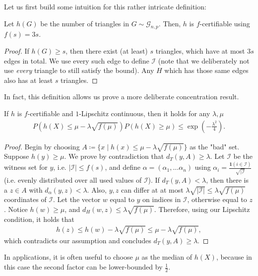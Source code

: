 Let us first build some intuition for this rather intricate definition:
\begin{example}
    Let $h(G)$ be the number of triangles in $G \sim \mathcal G_{n,p}$.
    Then, $h$ is $f$-certifiable using $f(s) = 3s$.
    \begin{proof}
        If $h(G) \geq s$, then there exist (at least) $s$ triangles, which have at most $3s$ edges in total.
        We use every such edge to define $\mathcal I$ (note that we deliberately not use \emph{every} triangle to still satisfy the bound).
        Any $H$ which has those same edges also has at least $s$ triangles.
    \end{proof}
\end{example}
In fact, this definition allows us prove a more deliberate concentration result.
\begin{theorem}
    If $h$ is $f$-certifiable and $1$-Lipschitz continuous, then it holds for any $\lambda,\mu$
    \begin{align*}
        P\left(h(X) \leq \mu - \lambda \sqrt{f(\mu)}\right) P(h(X) \geq \mu) \leq \exp\left(-\frac{\lambda^2}{4}\right).
    \end{align*}
\end{theorem}
\begin{proof}
    Begin by choosing $A \coloneqq \{x \mid h(x) \leq \mu - \lambda \sqrt{f(\mu)} \}$
    as the "bad" set.
    Suppose $h(y) \geq \mu$. We prove by contradiction that $d_T(y,A) \geq \lambda$.
    Let $\mathcal I$ be the witness set for $y$, i.e. $|\mathcal I| \leq f(s)$,
    and define $\alpha = (\alpha_1, \dots \alpha_n)$ using $\alpha_i = \frac{\mathbf{1}(i \in \mathcal I)}{\sqrt{|\mathcal I}}$
    (i.e. evenly distributed over all used values of $\mathcal I$).
    If $d_T(y,A) < \lambda$, then there is a $z \in A$ with $d_\alpha(y,z) < \lambda$.
    Also, $y,z$ can differ at at most $\lambda \sqrt{|\mathcal I|} \leq \lambda \sqrt{f(\mu)}$ coordinates of $\mathcal I$.
    Let the vector $w$ equal to $y$ on indices in $\mathcal I$, otherwise equal to $z$.
    Notice $h(w)\geq \mu$, and $d_H(w,z) \leq \lambda \sqrt{f(\mu)}$.
    Therefore, using our Lipschitz condition, it holds that
    \begin{align*}
        h(z) \leq h(w) - \lambda\sqrt{f(\mu)} \leq \mu - \lambda \sqrt{f(\mu)},
    \end{align*}
    which contradicts our assumption and concludes $d_T(y,A) \geq \lambda$.
\end{proof}
\begin{remark} \label{rem:mu_as_med}
    In applications, it is often useful to choose $\mu$ as the median of $h(X)$,
    because in this case the second factor can be lower-bounded by $\frac{1}{2}$.
\end{remark}
